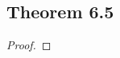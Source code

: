 \documentclass[../../main.tex]{subfiles}
\begin{document}
\subsection{Theorem 6.5}
\begin{wts}

\end{wts}
\begin{proof}

\end{proof}
\end{document}
